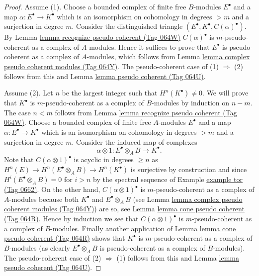 \documentclass{amsart}
\theoremstyle{plain}
\theoremstyle{definition}
\theoremstyle{remark}
\numberwithin{equation}{subsection}
\begin{document}
\begin{proof}
Assume (1). Choose a bounded complex of finite free $B$-modules
$E^\bullet$ and a map $\alpha : E^\bullet \to K^\bullet$ which is
an isomorphism on cohomology in degrees $> m$ and a surjection in degree $m$.
Consider the distinguished triangle
$(E^\bullet, K^\bullet, C(\alpha)^\bullet)$. By
Lemma \href{https://stacks.math.columbia.edu/tag/064W}{lemma recognize pseudo coherent (Tag 064W)}
$C(\alpha)^\bullet$ is $m$-pseudo-coherent as a complex of
$A$-modules. Hence it suffices to prove that $E^\bullet$ is
pseudo-coherent as a complex of $A$-modules, which follows from
Lemma \href{https://stacks.math.columbia.edu/tag/064Y}{lemma complex pseudo coherent modules (Tag 064Y)}.
The pseudo-coherent case of (1) $\Rightarrow$ (2) follows from this and
Lemma \href{https://stacks.math.columbia.edu/tag/064U}{lemma pseudo coherent (Tag 064U)}.

\medskip\noindent
Assume (2). Let $n$ be the largest integer such that $H^n(K^\bullet) \not = 0$.
We will prove that $K^\bullet$ is $m$-pseudo-coherent as a complex
of $B$-modules by induction on $n - m$. The case $n < m$ follows from
Lemma \href{https://stacks.math.columbia.edu/tag/064W}{lemma recognize pseudo coherent (Tag 064W)}.
Choose a bounded complex of finite free $A$-modules $E^\bullet$ and a
map $\alpha : E^\bullet \to K^\bullet$ which is an isomorphism on
cohomology in degrees $> m$ and a surjection in degree $m$.
Consider the induced map of complexes
$$
\alpha \otimes 1 : E^\bullet \otimes_A B \to K^\bullet.
$$
Note that $C(\alpha \otimes 1)^\bullet$ is acyclic in degrees
$\geq n$ as $H^n(E) \to H^n(E^\bullet \otimes_A B) \to H^n(K^\bullet)$
is surjective by construction and since $H^i(E^\bullet \otimes_A B) = 0$
for $i > n$ by the spectral sequence of
Example \href{https://stacks.math.columbia.edu/tag/0662}{example tor (Tag 0662)}.
On the other hand, $C(\alpha \otimes 1)^\bullet$
is $m$-pseudo-coherent as a complex of $A$-modules because
both $K^\bullet$ and $E^\bullet \otimes_A B$ (see
Lemma \href{https://stacks.math.columbia.edu/tag/064Y}{lemma complex pseudo coherent modules (Tag 064Y)})
are so, see
Lemma \href{https://stacks.math.columbia.edu/tag/064R}{lemma cone pseudo coherent (Tag 064R)}.
Hence by induction we see that $C(\alpha \otimes 1)^\bullet$
is $m$-pseudo-coherent as a complex of $B$-modules. Finally
another application of
Lemma \href{https://stacks.math.columbia.edu/tag/064R}{lemma cone pseudo coherent (Tag 064R)}
shows that $K^\bullet$ is $m$-pseudo-coherent as a complex of $B$-modules
(as clearly $E^\bullet \otimes_A B$ is pseudo-coherent as a complex
of $B$-modules). The pseudo-coherent case
of (2) $\Rightarrow$ (1) follows from this and
Lemma \href{https://stacks.math.columbia.edu/tag/064U}{lemma pseudo coherent (Tag 064U)}.
\end{proof}
\end{document}
